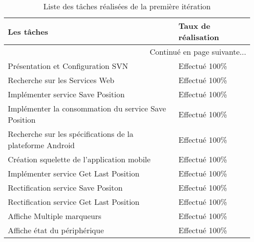 \begin{center}
    \begin{longtable}{| l | l |}
        \caption{Liste des tâches réalisées de la première itération}
\label{tab:sprint1-evaluation} \\

        \hline
        \textbf{Les tâches} & \textbf{Taux de réalisation} \\ \hline
        \endhead

        \hline \multicolumn{2}{|r|}{{Continué en page suivante$\dotsc$}} \\ \hline
        \endfoot

        \hline \hline
        \endlastfoot

        \hline
Présentation et Configuration SVN & Effectué 100\% \\ \hline
Recherche sur les Services Web & Effectué 100\% \\ \hline
Implémenter service Save Position & Effectué 100\% \\ \hline
Implémenter la consommation du service Save Position & Effectué 100\% \\ \hline
Recherche sur les spécifications de la plateforme Android & Effectué 100\% \\ \hline
Création squelette de l'application mobile & Effectué 100\% \\ \hline
Implémenter service Get Last Position & Effectué 100\% \\ \hline
Rectification service Save Positon & Effectué 100\% \\ \hline
Rectification service Get Last Position & Effectué 100\% \\ \hline
Affiche Multiple marqueurs & Effectué 100\% \\ \hline
Affiche état du périphérique & Effectué 100\% \\ \hline
    \end{longtable}
\end{center}
